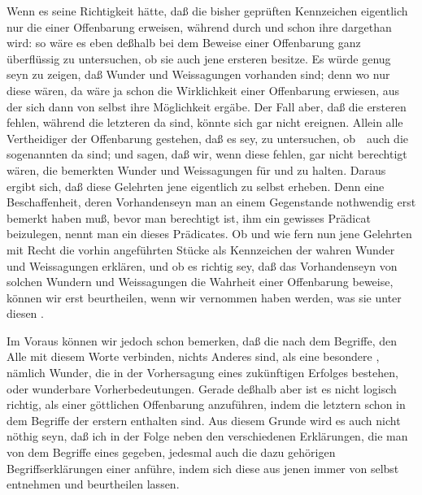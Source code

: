 \begin{aufza}
\item Wenn es seine Richtigkeit hätte, daß die bisher geprüften Kennzeichen eigentlich nur die  einer Offenbarung erweisen, während durch  und  schon ihre  dargethan wird: so wäre es eben deßhalb bei dem Beweise einer Offenbarung ganz überflüssig zu untersuchen, ob  sie auch jene ersteren besitze. Es würde genug seyn zu zeigen, daß Wunder und Weissagungen vorhanden sind; denn wo nur diese wären, da wäre ja schon die Wirklichkeit einer Offenbarung erwiesen, aus der sich dann von selbst ihre Möglichkeit ergäbe. Der Fall aber, daß die ersteren fehlen, während die letzteren da sind, könnte sich gar nicht ereignen. Allein alle Vertheidiger der Offenbarung gestehen, daß es  sey, zu untersuchen, ob~\ auch die sogenannten  da sind; und sagen, daß wir, wenn diese fehlen, gar nicht berechtigt wären, die bemerkten Wunder und Weissagungen für  und  zu halten. Daraus ergibt sich, daß diese Gelehrten jene  eigentlich zu  selbst erheben. Denn eine Beschaffenheit, deren Vorhandenseyn man an einem Gegenstande nothwendig erst bemerkt haben muß, bevor man berechtigt ist, ihm ein gewisses Prädicat beizulegen, nennt man ein  dieses Prädicates. Ob und wie fern nun jene Gelehrten mit Recht die vorhin angeführten Stücke als Kennzeichen der wahren Wunder und Weissagungen erklären, und ob es richtig sey, daß das Vorhandenseyn von solchen Wundern und Weissagungen die Wahrheit einer Offenbarung beweise, können wir erst beurtheilen, wenn wir vernommen haben werden, was sie unter diesen .
\item Im Voraus können wir jedoch schon bemerken, daß die  nach dem Begriffe, den Alle mit diesem Worte verbinden, nichts Anderes sind, als eine besondere , nämlich Wunder, die in der Vorhersagung eines zukünftigen Erfolges bestehen, oder wunderbare Vorherbedeutungen. Gerade deßhalb aber ist es nicht logisch richtig, als  einer göttlichen Offenbarung anzuführen, indem die letztern schon in dem Begriffe der erstern enthalten sind. Aus diesem Grunde wird es auch nicht nöthig seyn, daß ich in der Folge neben den verschiedenen Erklärungen, die man von dem Begriffe eines  gegeben, jedesmal auch die dazu gehörigen Begriffserklärungen einer  anführe, indem sich diese aus jenen immer von selbst entnehmen und beurtheilen lassen.
\end{aufza}

